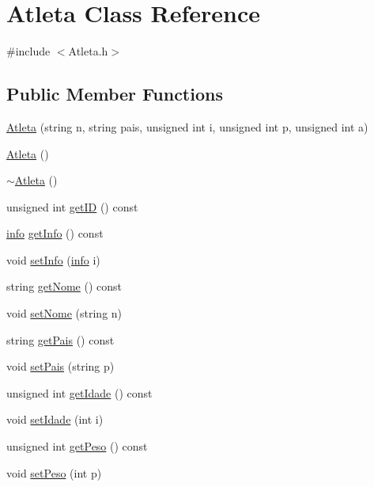 \hypertarget{class_atleta}{}\section{Atleta Class Reference}
\label{class_atleta}


{\ttfamily \#include $<$Atleta.\+h$>$}

\subsection*{Public Member Functions}
\begin{DoxyCompactItemize}
\item 
\hyperlink{class_atleta_abd3d28e4321bd53ed8aa9c840a2278f1}{Atleta} (string n, string pais, unsigned int i, unsigned int p, unsigned int a)
\item 
\hyperlink{class_atleta_af1b4e011c71918d9c59b910afa88d64e}{Atleta} ()
\item 
\hyperlink{class_atleta_a6002feaeb345f754cdfde63987815dd2}{$\sim$\+Atleta} ()
\item 
unsigned int \hyperlink{class_atleta_a95ff067c6a7e3268425bfc97adf72171}{get\+I\+D} () const 
\item 
\hyperlink{structinfo}{info} \hyperlink{class_atleta_af8076b0fe0d69e6313685f1b3d7be27c}{get\+Info} () const 
\item 
void \hyperlink{class_atleta_ada229ccfc2a898c893c0a34c9c996892}{set\+Info} (\hyperlink{structinfo}{info} i)
\item 
string \hyperlink{class_atleta_a0f5be5cd0b18f224a7a5281216fc1bfd}{get\+Nome} () const 
\item 
void \hyperlink{class_atleta_a35fcdb190f9b6b5100fba23cc98e5304}{set\+Nome} (string n)
\item 
string \hyperlink{class_atleta_a6b19798bf0eca5caed86134b7932264d}{get\+Pais} () const 
\item 
void \hyperlink{class_atleta_a3a4c881326e44433537d44727d7d60de}{set\+Pais} (string p)
\item 
unsigned int \hyperlink{class_atleta_ad0a209bea90007c372d07465cb410fbc}{get\+Idade} () const 
\item 
void \hyperlink{class_atleta_a62b5097c74ad66181a05d6562c1a9a25}{set\+Idade} (int i)
\item 
unsigned int \hyperlink{class_atleta_aade1b300b0ed29445f63bed20392888c}{get\+Peso} () const 
\item 
void \hyperlink{class_atleta_af9ef31c49a31a7a4514f6c676caad01d}{set\+Peso} (int p)

\end{DoxyCompactItemize}
